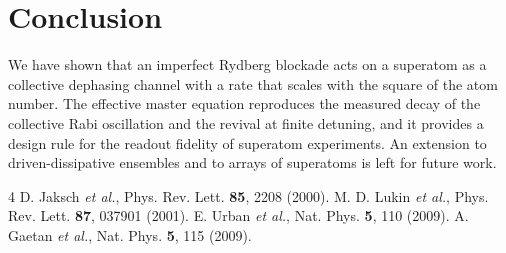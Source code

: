 \documentclass[aps,pra,twocolumn,superscriptaddress,10pt]{revtex4-2}
\begin{document}
\section{Conclusion}

We have shown that an imperfect Rydberg blockade acts on a superatom as a
collective dephasing channel with a rate that scales with the square of the
atom number. The effective master equation reproduces the measured decay of
the collective Rabi oscillation and the revival at finite detuning, and it
provides a design rule for the readout fidelity of superatom experiments. An
extension to driven-dissipative ensembles and to arrays of superatoms is left
for future work.

\begin{thebibliography}{4}
 D. Jaksch \textit{et al.}, Phys. Rev. Lett. \textbf{85}, 2208 (2000).
 M. D. Lukin \textit{et al.}, Phys. Rev. Lett. \textbf{87}, 037901 (2001).
 E. Urban \textit{et al.}, Nat. Phys. \textbf{5}, 110 (2009).
 A. Gaetan \textit{et al.}, Nat. Phys. \textbf{5}, 115 (2009).
\end{thebibliography}
\end{document}
